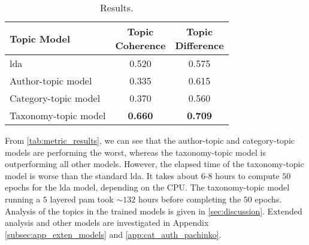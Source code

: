 \begin{table}[h]
	\centering
	\caption{Results.}
	\begin{tabular}{l|c|c}
		Topic Model & \makecell{Topic \\ Coherence} & \makecell{Topic \\ Difference} \\
		\midrule
		\Acrlong{lda} & 0.520 & 0.575 \\
		Author-topic model & 0.335 & 0.615 \\
		Category-topic model & 0.370 & 0.560 \\
		Taxonomy-topic model & \textbf{0.660} & \textbf{0.709} \\
	\end{tabular}
	\label{tab:metric_results}
\end{table}

From \autoref{tab:metric_results}, we can see that the author-topic and category-topic models are performing the worst, whereas the taxonomy-topic model is outperforming all other models.
However, the elapsed time of the taxonomy-topic model is worse than the standard \gls{lda}.
It takes about $6$-$8$ hours to compute $50$ epochs for the \gls{lda} model, depending on the CPU. 
The taxonomy-topic model running a $5$ layered \gls{pam} took ${\sim}132$ hours before completing the $50$ epochs.
Analysis of the topics in the trained models is given in \autoref{sec:discussion}.
Extended analysis and other models are investigated in Appendix \autoref{subsec:app_exten_models} and \autoref{app:cat_auth_pachinko}.
